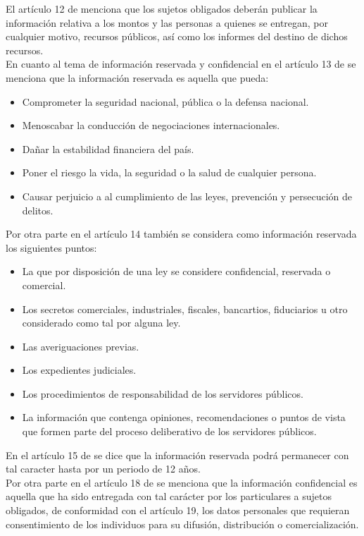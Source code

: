\documentclass[runningheads,a4paper]{llncs}
\begin{document}
El artículo 12 de \cite{LTAIP_1} menciona que los sujetos obligados deberán publicar la información relativa a los montos y las personas a quienes se entregan, por cualquier motivo, recursos públicos, así como los informes del destino de dichos recursos.\\

En cuanto al tema de información reservada y confidencial en el artículo 13 de \cite{LTAIP_1} se menciona que la información reservada es aquella que pueda:

\begin{itemize}
	\item Comprometer la seguridad nacional, pública o la defensa nacional.
	\item Menoscabar la conducción de negociaciones internacionales.
	\item Dañar la estabilidad financiera del país.
	\item Poner el riesgo la vida, la seguridad o la salud de cualquier persona.
	\item Causar perjuicio a al cumplimiento de las leyes, prevención y persecución de delitos.	
\end{itemize}

Por otra parte en el artículo 14 también se considera como información reservada los siguientes puntos:
\begin{itemize}
	\item La que por disposición de una ley se considere confidencial, reservada o comercial.
	\item Los secretos comerciales, industriales, fiscales, bancartios, fiduciarios u otro considerado como tal por alguna ley.
	\item Las averiguaciones previas.
	\item Los expedientes judiciales.
	\item Los procedimientos de responsabilidad de los servidores públicos.
	\item La información que contenga opiniones, recomendaciones o puntos de vista que formen parte del proceso deliberativo de los servidores públicos.
\end{itemize}

En el artículo 15 de \cite{LTAIP_1} se dice que la información reservada podrá permanecer con tal caracter hasta por un periodo de 12 años. \\

Por otra parte en el artículo 18 de \cite{LTAIP_1} se menciona que la información confidencial es aquella que ha sido entregada con tal carácter por los particulares a sujetos obligados, de conformidad con el artículo 19, los datos personales que requieran consentimiento de los individuos para su difusión, distribución o comercialización.\\
\end{document}
